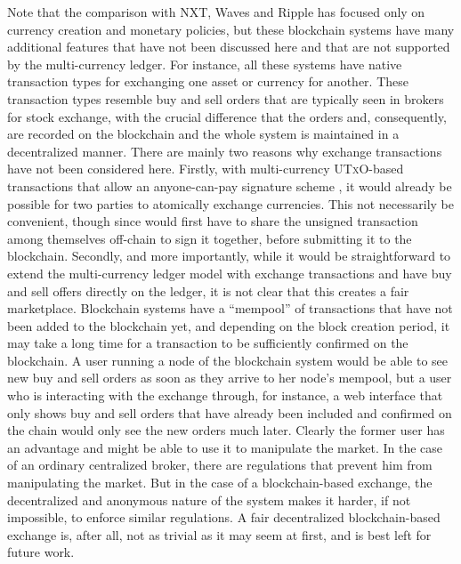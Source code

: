 \documentclass{llncs}
\newcommand{\utxo}{\textsc{UTxO}\xspace}
\begin{document}
Note that the comparison with NXT, Waves and Ripple has focused only on currency creation and monetary policies, but these blockchain systems have many additional features that have not been discussed here and that are not supported by the multi-currency ledger. For instance, all these systems have native transaction types for exchanging one asset or currency for another. These transaction types resemble buy and sell orders that are typically seen in brokers for stock exchange, with the crucial difference that the orders and, consequently, are recorded on the blockchain and the whole system is maintained in a decentralized manner. There are mainly two reasons why exchange transactions have not been considered here. Firstly, with multi-currency \utxo-based transactions that allow an anyone-can-pay signature scheme \cite{OpCheckSig}, it would already be possible for two parties to atomically exchange currencies. This not necessarily be convenient, though since would first have to share the unsigned transaction among themselves off-chain to sign it together, before submitting it to the blockchain. Secondly, and more importantly, while it would be straightforward to extend the multi-currency ledger model with exchange transactions and have buy and sell offers directly on the ledger, it is not clear that this creates a fair marketplace. Blockchain systems have a ``mempool'' of transactions that have not been added to the blockchain yet, and depending on the block creation period, it may take a long time for a transaction to be sufficiently confirmed on the blockchain. A user running a node of the blockchain system would be able to see new buy and sell orders as soon as they arrive to her node's mempool, but a user who is interacting with the exchange through, for instance, a web interface that only shows buy and sell orders that have already been included and confirmed on the chain would only see the new orders much later. Clearly the former user has an advantage and might be able to use it to manipulate the market. In the case of an ordinary centralized broker, there are regulations that prevent him from manipulating the market. But in the case of a blockchain-based exchange, the decentralized and anonymous nature of the system makes it harder, if not impossible, to enforce similar regulations. A fair decentralized blockchain-based exchange is, after all, not as trivial as it may seem at first, and is best left for future work.
\end{document}

